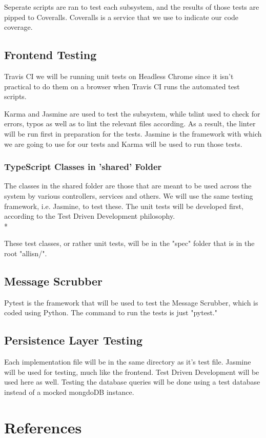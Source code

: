 \documentclass[11pt]{article}
\begin{document}
Seperate scripts are ran to test each subsystem, and the results of those tests are pipped to Coveralls. Coveralls is a service that we use to indicate our code coverage.

\subsection{Frontend Testing}

Travis CI we will be running unit tests on Headless Chrome\cite{Website:3} since it isn't practical to do them on a browser when Travis CI runs the automated test scripts.\par
Karma and Jasmine are used to test the subsystem, while tslint used to check for errors, typos as well as to lint the relevant files according. As a result, the linter will be run first in preparation for the tests. Jasmine is the framework with which we are going to use for our tests and Karma will be used to run those tests.

\subsubsection{TypeScript Classes in 'shared' Folder}

The classes in the shared folder are those that are meant to be used across the system by various controllers, services and others. We will use the same testing framework, i.e. Jasmine, to test these. The unit tests will be developed first, according to the Test Driven Development philosophy.\\*

These test classes, or rather unit tests, will be in the "spec" folder that is in the root "allisn/".

\subsection{Message Scrubber}

Pytest is the framework that will be used to test the Message Scrubber, which is coded using Python. The command to run the tests is just "pytest."

\subsection{Persistence Layer Testing}

Each implementation file will be in the same directory as it's test file. Jasmine will be used for testing, much like the frontend. Test Driven Development will be used here as well. Testing the database queries will be done using a test database instead of a mocked mongdoDB instance.

\section{References}


\end{document}
